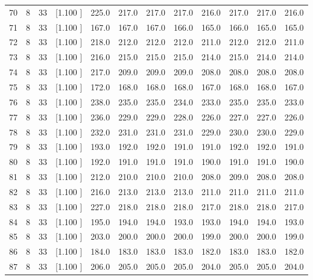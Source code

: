 \documentclass[12pt,a4paper]{article}
\begin{document}
\begin{center}
{\begin{tabular}{r r r r r r r r r r r r}
  70&  8& 33&[1.100     ]&   225.0&   217.0&   217.0&   217.0&   216.0&   217.0&   217.0&   216.0\\[-0.02in]
  71&  8& 33&[1.100     ]&   167.0&   167.0&   167.0&   166.0&   165.0&   166.0&   165.0&   165.0\\[-0.02in]
  72&  8& 33&[1.100     ]&   218.0&   212.0&   212.0&   212.0&   211.0&   212.0&   212.0&   211.0\\[-0.02in]
  73&  8& 33&[1.100     ]&   216.0&   215.0&   215.0&   215.0&   214.0&   215.0&   214.0&   214.0\\[-0.02in]
  74&  8& 33&[1.100     ]&   217.0&   209.0&   209.0&   209.0&   208.0&   208.0&   208.0&   208.0\\[-0.02in]
  75&  8& 33&[1.100     ]&   172.0&   168.0&   168.0&   168.0&   167.0&   168.0&   168.0&   167.0\\[-0.02in]
  76&  8& 33&[1.100     ]&   238.0&   235.0&   235.0&   234.0&   233.0&   235.0&   235.0&   233.0\\[-0.02in]
  77&  8& 33&[1.100     ]&   236.0&   229.0&   229.0&   228.0&   226.0&   227.0&   227.0&   226.0\\[-0.02in]
  78&  8& 33&[1.100     ]&   232.0&   231.0&   231.0&   231.0&   229.0&   230.0&   230.0&   229.0\\[-0.02in]
  79&  8& 33&[1.100     ]&   193.0&   192.0&   192.0&   191.0&   191.0&   192.0&   192.0&   191.0\\[-0.02in]
  80&  8& 33&[1.100     ]&   192.0&   191.0&   191.0&   191.0&   190.0&   191.0&   191.0&   190.0\\[-0.02in]
  81&  8& 33&[1.100     ]&   212.0&   210.0&   210.0&   210.0&   208.0&   209.0&   208.0&   208.0\\[-0.02in]
  82&  8& 33&[1.100     ]&   216.0&   213.0&   213.0&   213.0&   211.0&   211.0&   211.0&   211.0\\[-0.02in]
  83&  8& 33&[1.100     ]&   227.0&   218.0&   218.0&   218.0&   217.0&   218.0&   218.0&   217.0\\[-0.02in]
  84&  8& 33&[1.100     ]&   195.0&   194.0&   194.0&   193.0&   193.0&   194.0&   194.0&   193.0\\[-0.02in]
  85&  8& 33&[1.100     ]&   203.0&   200.0&   200.0&   200.0&   199.0&   200.0&   200.0&   199.0\\[-0.02in]
  86&  8& 33&[1.100     ]&   184.0&   183.0&   183.0&   183.0&   182.0&   183.0&   183.0&   182.0\\[-0.02in]
  87&  8& 33&[1.100     ]&   206.0&   205.0&   205.0&   205.0&   204.0&   205.0&   205.0&   204.0\\[-0.02in]

\end{tabular}}
\end{center}
\end{document}
